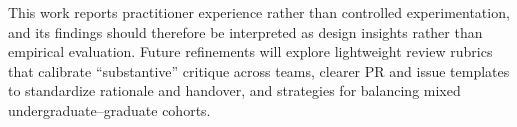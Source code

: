 This work reports practitioner experience rather than controlled experimentation, and its findings should therefore be interpreted as design insights rather than empirical evaluation. Future refinements will explore lightweight review rubrics that calibrate ``substantive'' critique across teams, clearer PR and issue templates to standardize rationale and handover, and strategies for balancing mixed undergraduate–graduate cohorts.
